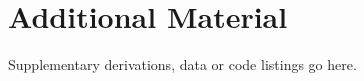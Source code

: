 \chapter{Additional Material}
\label{app:extra}

Supplementary derivations, data or code listings go here.
